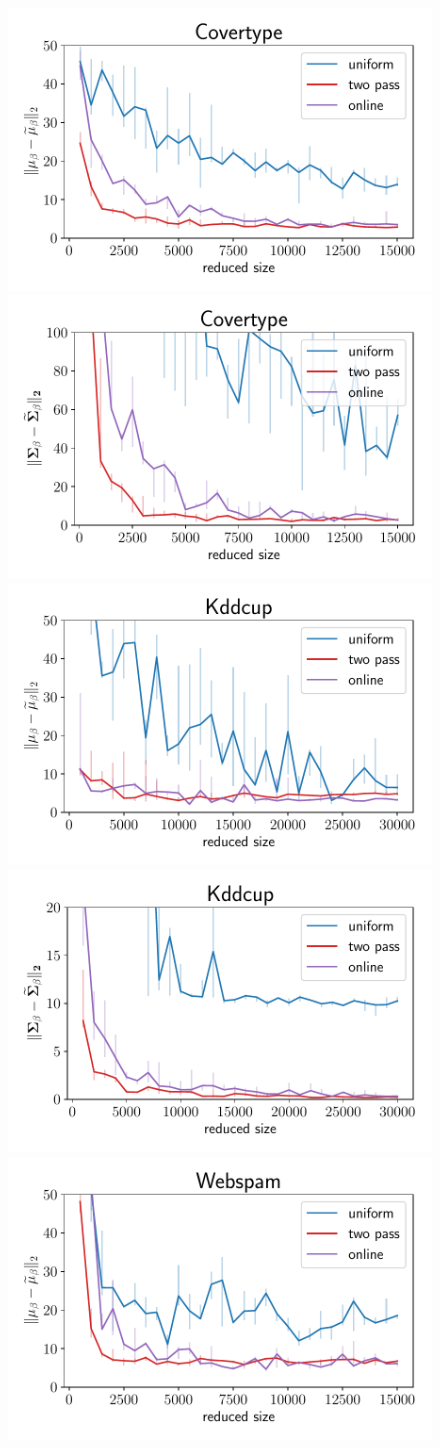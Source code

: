 \begin{figure}[t]
    \centering
    \includegraphics[width=.49\linewidth]{figures/covertype_bayes_plot_norm.pdf}
    \includegraphics[width=.49\linewidth]{figures/covertype_bayes_plot_matrix_norm.pdf}
    \includegraphics[width=.49\linewidth]{figures/kddcup_bayes_plot_norm.pdf}
    \includegraphics[width=.49\linewidth]{figures/kddcup_bayes_plot_matrix_norm.pdf}
    \includegraphics[width=.49\linewidth]{figures/webspam_bayes_plot_norm.pdf}

\end{figure}
